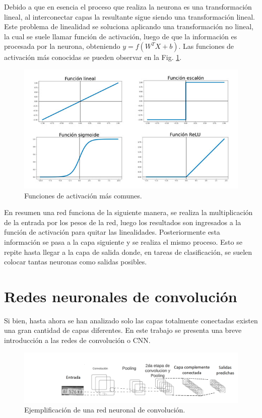 Debido a que en esencia el proceso que realiza la neurona es una transformación lineal, al interconectar capas la resultante sigue siendo una transformación lineal.
Este problema de linealidad se soluciona aplicando una transformación no lineal, la cual se suele llamar función de activación,
luego de que la información es procesada por la neurona, obteniendo $y= f(W^T X + b)$. Las funciones de activación más conocidas se pueden observar en la Fig. \ref{fig:funciones-activacion}.

\begin{figure}[bth]
    \centering
    \includegraphics[width=1\textwidth]{imgs/Funciones-de-activacion.jpg}
    \caption{Funciones de activación más comunes.}
    \label{fig:funciones-activacion}
\end{figure}

En resumen una red funciona de la siguiente manera, se realiza la multiplicación de la entrada por los pesos de la red, luego los resultados son ingresados a la función de activación para quitar las linealidades. Posteriormente esta información se pasa a la capa siguiente y se realiza el mismo proceso. Esto se repite hasta llegar a la capa de salida donde, en tareas de clasificación, se suelen colocar tantas neuronas como salidas posibles.

\section{Redes neuronales de convolución}

Si bien, hasta ahora se han analizado solo las capas totalmente conectadas existen una gran cantidad de capas diferentes. En este trabajo se presenta una breve introducción a las redes de convolución o CNN.

\begin{figure}[bth]
    \centering
    \includegraphics[width=1\textwidth]{imgs/CNN-completa.png}
    \caption{Ejemplificación de una red neuronal de convolución.}
    \label{fig:esquema-CNN}
\end{figure}


